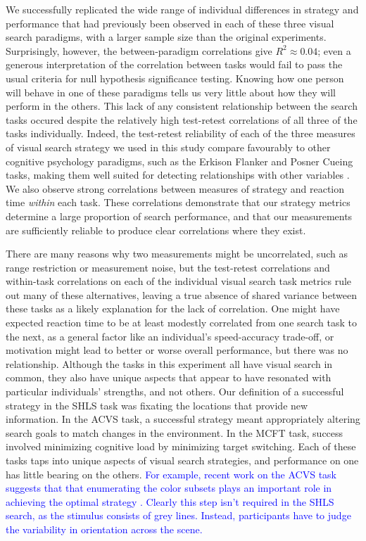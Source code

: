 \documentclass[Afour, sageapa, times]{sagej}
\begin{document}
We successfully replicated the wide range of individual differences in strategy and performance that had previously been observed in each of these three visual search paradigms, with a larger sample size than the original experiments. Surprisingly, however, the between-paradigm correlations give $R^2 \approx 0.04$; even a generous interpretation of the correlation between tasks would fail to pass the usual criteria for null hypothesis significance testing. Knowing how one person will behave in one of these paradigms tells us very little about how they will perform in the others. This lack of any consistent relationship between the search tasks occured despite the relatively high test-retest correlations of all three of the tasks individually. Indeed, the test-retest reliability of each of the three measures of visual search strategy we used in this study compare favourably to other cognitive psychology paradigms, such as the Erkison Flanker and Posner Cueing tasks, making them well suited for detecting relationships with other variables \cite{hedge2018}. We also observe strong correlations between measures of strategy and reaction time \textit{within} each task. These correlations demonstrate that our strategy metrics determine a large proportion of search performance, and that our measurements are sufficiently reliable to produce clear correlations where they exist. 

There are many reasons why two measurements might be uncorrelated, such as range restriction or measurement noise, but the test-retest correlations and within-task correlations on each of the individual visual search task metrics rule out many of these alternatives, leaving a true absence of shared variance between these tasks as a likely explanation for the lack of correlation. One might have expected reaction time to be at least modestly correlated from one search task to the next, as a general factor like an individual's speed-accuracy trade-off, or motivation might lead to better or worse overall performance, but there was no relationship. Although the tasks in this experiment all have visual search in common, they also have unique aspects that appear to have resonated with particular individuals' strengths, and not others. Our definition of a successful strategy in the SHLS task was fixating the locations that provide new information. In the ACVS task, a successful strategy meant appropriately altering search goals to match changes in the environment. In the MCFT task, success involved minimizing cognitive load by minimizing target switching. Each of these tasks taps into unique aspects of visual search strategies, and performance on one has little bearing on the others. \textcolor{blue}{For example, recent work on the ACVS task suggests that that enumerating the color subsets plays an important role in achieving the optimal strategy \cite{hansen2019taking}. Clearly this step isn't required in the SHLS search, as the stimulus consists of grey lines. Instead, participants have to judge the variability in orientation across the scene. }
\end{document}
